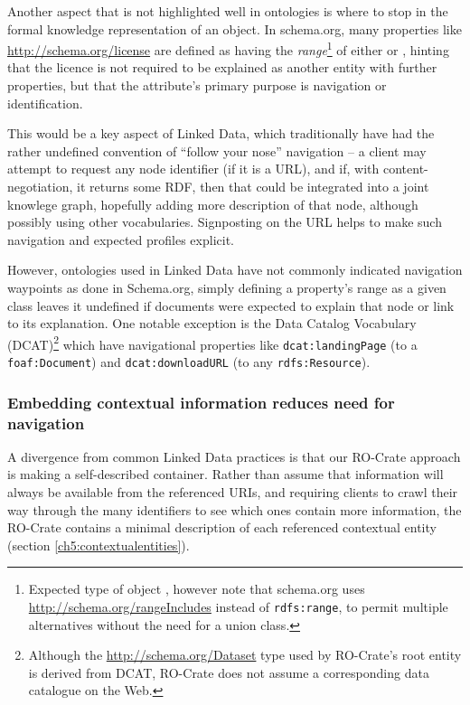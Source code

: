 Another aspect that is not highlighted well in ontologies is where to stop in the formal knowledge representation of an object.
In schema.org, many properties like \url{http://schema.org/license} are defined as having the \emph{range}\footnote{Expected type of object \cite{Guha 2014}, however note that schema.org uses \url{http://schema.org/rangeIncludes} instead of \texttt{rdfs:range}, to permit multiple alternatives without the need for a union class.} of either  or , hinting that the licence is not required to be explained as another entity with further properties, but that the attribute's primary purpose is navigation or identification. 

This would be a key aspect of Linked Data, which traditionally have had the rather undefined convention of ``follow your nose'' navigation -- a client may attempt to request any node identifier (if it is a URL), and if, with content-negotiation, it returns some RDF, then that could be integrated into a joint knowlege graph, hopefully adding more description of that node, although possibly using other vocabularies.
Signposting on the URL helps to make such navigation and expected profiles explicit.

However, ontologies used in Linked Data have not commonly indicated navigation waypoints as done in Schema.org, simply defining a property's range as a given class leaves it undefined if documents were expected to explain that node or link to its explanation. One notable exception is the Data Catalog Vocabulary (DCAT)\footnote{Although the \url{http://schema.org/Dataset} type used by RO-Crate's root entity is derived from DCAT, RO-Crate does not assume a corresponding data catalogue on the Web.} \cite{Albertoni 2020} which have navigational properties like \texttt{dcat:landingPage} (to a \texttt{foaf:Document}) and \texttt{dcat:downloadURL} (to any \texttt{rdfs:Resource}).


\subsubsection{Embedding contextual information reduces need for navigation}
\label{ch61:contextual}

A divergence from common Linked Data practices is that our RO-Crate approach is making a self-described container.
Rather than assume that information will always be available from the referenced URIs, and requiring clients to crawl their way through the many identifiers to see which ones contain more information, the RO-Crate contains a minimal description of each referenced contextual entity (section \vref{ch5:contextualentities}). 

